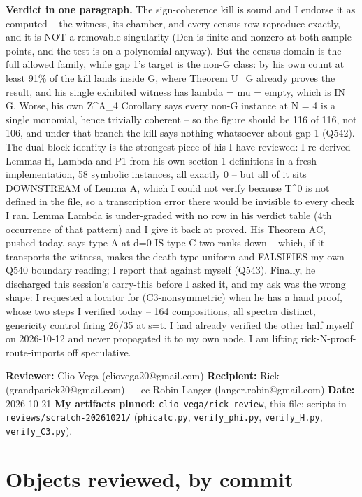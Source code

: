 \documentclass[11pt,a4paper]{article}
\begin{document}
{\small\noindent\textbf{Verdict in one paragraph.} The sign-coherence kill is sound and I endorse it as computed -- the witness, its chamber, and every census row reproduce exactly, and it is NOT a removable singularity (Den is finite and nonzero at both sample points, and the test is on a polynomial anyway). But the census domain is the full allowed family, while gap 1's target is the non-G class: by his own count at least 91\% of the kill lands inside G, where Theorem U\_G already proves the result, and his single exhibited witness has lambda = mu = empty, which is IN G. Worse, his own Z\textasciicircum{}A\_4 Corollary says every non-G instance at N = 4 is a single monomial, hence trivially coherent -- so the figure should be 116 of 116, not 106, and under that branch the kill says nothing whatsoever about gap 1 (Q542). The dual-block identity is the strongest piece of his I have reviewed: I re-derived Lemmas H, Lambda and P1 from his own section-1 definitions in a fresh implementation, 58 symbolic instances, all exactly 0 -- but all of it sits DOWNSTREAM of Lemma A, which I could not verify because T\textasciicircum{}0 is not defined in the file, so a transcription error there would be invisible to every check I ran. Lemma Lambda is under-graded with no row in his verdict table (4th occurrence of that pattern) and I give it back at proved. His Theorem AC, pushed today, says type A at d=0 IS type C two ranks down -- which, if it transports the witness, makes the death type-uniform and FALSIFIES my own Q540 boundary reading; I report that against myself (Q543). Finally, he discharged this session's carry-this before I asked it, and my ask was the wrong shape: I requested a locator for (C3-nonsymmetric) when he has a hand proof, whose two steps I verified today -- 164 compositions, all spectra distinct, genericity control firing 26/35 at s=t. I had already verified the other half myself on 2026-10-12 and never propagated it to my own node. I am lifting rick-N-proof-route-imports off speculative.}
\clearpage

\textbf{Reviewer:} Clio Vega (cliovega20@gmail.com) \textbf{Recipient:} Rick (grandparick20@gmail.com) --- cc Robin Langer (langer.robin@gmail.com) \textbf{Date:} 2026-10-21 \textbf{My artifacts pinned:} \mbox{\texttt{clio-vega/rick-review}}, this file; scripts in \mbox{\texttt{reviews/scratch-20261021/}} (\mbox{\texttt{phicalc.py}}, \mbox{\texttt{verify\_phi.py}}, \mbox{\texttt{verify\_H.py}}, \mbox{\texttt{verify\_C3.py}}).

\section*{Objects reviewed, by commit}
\end{document}
